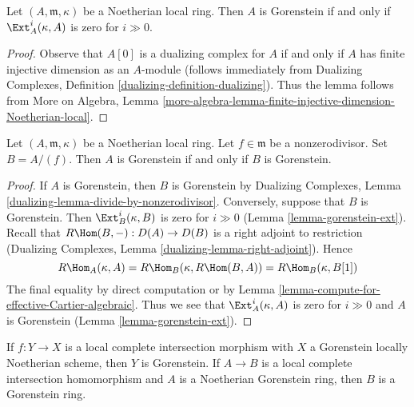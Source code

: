 \begin{lemma}
\label{lemma-gorenstein-ext}
Let $(A, \mathfrak m, \kappa)$ be a Noetherian local ring.
Then $A$ is Gorenstein if and only if $\Ext^i_A(\kappa, A)$
is zero for $i \gg 0$.
\end{lemma}

\begin{proof}
Observe that $A[0]$ is a dualizing complex for $A$ if and only
if $A$ has finite injective dimension as an $A$-module
(follows immediately from Dualizing Complexes, Definition
\ref{dualizing-definition-dualizing}).
Thus the lemma follows from More on Algebra, Lemma
\ref{more-algebra-lemma-finite-injective-dimension-Noetherian-local}.
\end{proof}

\begin{lemma}
\label{lemma-gorenstein-divide-by-nonzerodivisor}
Let $(A, \mathfrak m, \kappa)$
be a Noetherian local ring. Let $f \in \mathfrak m$ be a
nonzerodivisor. Set $B = A/(f)$. Then $A$ is Gorenstein if and
only if $B$ is Gorenstein.
\end{lemma}

\begin{proof}
If $A$ is Gorenstein, then $B$ is Gorenstein by
Dualizing Complexes, Lemma \ref{dualizing-lemma-divide-by-nonzerodivisor}.
Conversely, suppose that $B$ is Gorenstein. Then
$\Ext^i_B(\kappa, B)$ is zero for $i \gg 0$
(Lemma \ref{lemma-gorenstein-ext}).
Recall that $R\Hom(B, -) : D(A) \to D(B)$ is a right adjoint
to restriction (Dualizing Complexes, Lemma \ref{dualizing-lemma-right-adjoint}).
Hence
$$
R\Hom_A(\kappa, A) = R\Hom_B(\kappa, R\Hom(B, A)) =
R\Hom_B(\kappa, B[1])
$$
The final equality by direct computation or by
Lemma \ref{lemma-compute-for-effective-Cartier-algebraic}.
Thus we see that $\Ext^i_A(\kappa, A)$ is zero for
$i \gg 0$ and $A$ is Gorenstein (Lemma \ref{lemma-gorenstein-ext}).
\end{proof}

\begin{lemma}
\label{lemma-gorenstein-lci}
If $f : Y \to X$ is a local complete intersection morphism
with $X$ a Gorenstein locally Noetherian scheme, then $Y$ is
Gorenstein. If $A \to B$ is a local complete intersection
homomorphism and $A$ is a Noetherian Gorenstein ring, then
$B$ is a Gorenstein ring.
\end{lemma}

